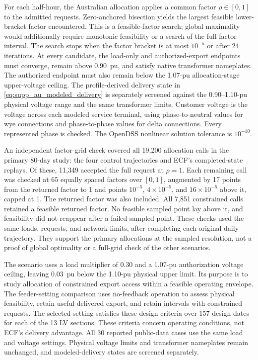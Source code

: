 \documentclass[11pt]{article}
\begin{document}
For each half-hour, the Australian allocation applies a common factor
$\rho\in[0,1]$ to the admitted requests. Zero-anchored bisection yields the
largest feasible lower-bracket factor encountered. This is a feasible-factor search; global maximality would additionally require
monotonic feasibility or a search of the full factor interval. The
search stops when the factor bracket is at most $10^{-5}$ or
after 24 iterations. At every candidate, the load-only and authorized-export
endpoints must converge, remain above 0.90~pu, and satisfy native transformer
nameplates. The authorized endpoint must also remain below the 1.07-pu
allocation-stage upper-voltage ceiling. The profile-derived delivery state in
\eqref{eq:supp_au_modeled_delivery} is separately screened against the
0.90--1.10-pu physical voltage range and the same transformer limits.
Customer voltage is the voltage across each modeled service terminal, using
phase-to-neutral values for wye connections and phase-to-phase values for delta
connections. Every represented phase is checked. The OpenDSS nonlinear
solution tolerance is $10^{-10}$.

An independent factor-grid check covered all 19,200 allocation calls in the
primary 80-day study: the four control trajectories and ECF's completed-state
replays. Of these, 11,349 accepted the full request at $\rho=1$. Each remaining
call was checked at 65 equally spaced factors over $[0,1]$, augmented by 17
points from the returned factor to 1 and points $10^{-5}$, $4\times10^{-5}$,
and $16\times10^{-5}$ above it, capped at 1. The returned factor was also
included. All 7,851 constrained calls retained a feasible returned factor.
No feasible sampled point lay above it, and feasibility did not reappear after
a failed sampled point. These checks used the same loads, requests, and
network limits, after completing each original daily trajectory. They support
the primary allocations at the sampled resolution, not a proof of global
optimality or a full-grid check of the other scenarios.

The scenario uses a load multiplier of 0.30 and a 1.07-pu authorization
voltage ceiling, leaving 0.03~pu below the 1.10-pu physical upper limit.
Its purpose is to study allocation of constrained export access within a
feasible operating envelope. The feeder-setting comparison uses no-feedback
operation to assess physical feasibility, retain useful
delivered export, and retain intervals with constrained requests. The selected
setting satisfies these design criteria over 157 design dates for each of
the 13 LV sections. These criteria concern operating conditions, not ECF's
delivery advantage. All 30 reported public-data cases use the same load and
voltage settings. Physical voltage limits and transformer nameplates remain
unchanged, and modeled-delivery states are screened separately.
\end{document}
